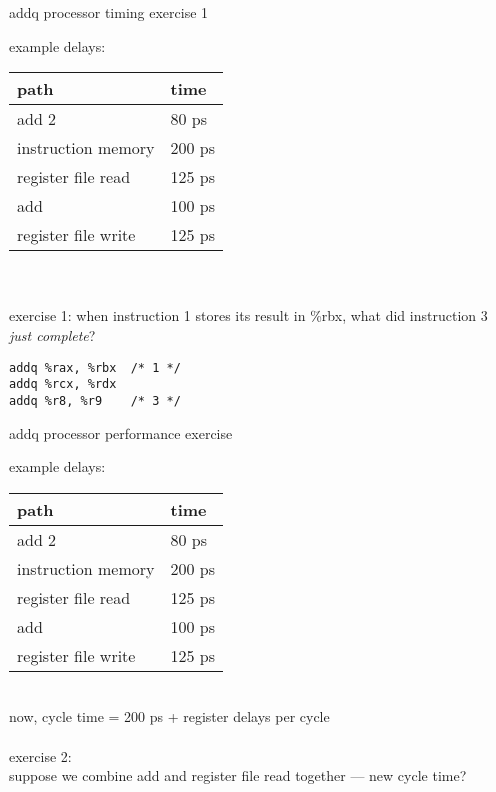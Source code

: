 \begin{frame}[fragile,label=addqPerfEx]{addq processor timing exercise 1}
{\small example delays: \\
\begin{tabular}{ll}
path & time \\ \hline
add 2 & 80 ps \\
instruction memory & 200 ps \\
register file read & 125 ps \\
add & 100 ps \\
register file write & 125 ps \\
\end{tabular}} \\
~ \\
exercise 1: when instruction 1 stores its result in \%rbx, what did instruction 3 \textit{just complete}?
\begin{lstlisting}[style=smaller]
addq %rax, %rbx  /* 1 */
addq %rcx, %rdx
addq %r8, %r9    /* 3 */
\end{lstlisting}
\end{frame}
\begin{frame}[fragile,label=addqPerfEx]{addq processor performance exercise}
{\small example delays: \\
\begin{tabular}{ll}
path & time \\ \hline
add 2 & 80 ps \\
instruction memory & 200 ps \\
register file read & 125 ps \\
add & 100 ps \\
register file write & 125 ps \\
\end{tabular}} \\
now, cycle time = 200 ps + register delays per cycle \\
~ \\
exercise 2: \\
suppose we combine add and register file read together --- new cycle time?
\end{frame}
